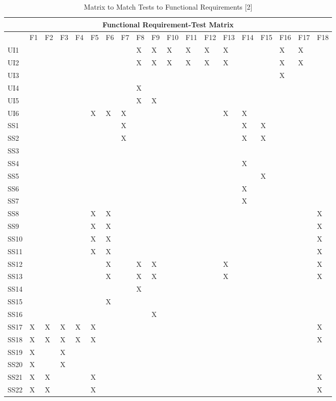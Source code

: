 \documentclass[11pt]{article}
\begin{document}
\begin{table}[H]
\centering
\caption{Matrix to Match Tests to Functional Requirements [2]}
\label{my-label}
\begin{tabular}{| l | l | l | l | l | l | l | l | l | l | l | l | l | l | l | l | l | l | l |}
\hline
\multicolumn{19}{|c|}{\textbf{Functional Requirement-Test Matrix}}                          \\ \hline
 & \tiny{F1} & \tiny{F2} & \tiny{F3} & \tiny{F4} & \tiny{F5} & \tiny{F6} & \tiny{F7} & \tiny{F8} & \tiny{F9} & \tiny{F10} & \tiny{F11} & \tiny{F12} & \tiny{F13} & \tiny{F14} & \tiny{F15} & \tiny{F16} & \tiny{F17} & \tiny{F18} \\ \hline
UI1&&&&&&&&X&X&X&X&X&X&&&X&X& \\ \hline
UI2&&&&&&&&X&X&X&X&X&X&&&X&X& \\ \hline
UI3&&&&&&&&&&&&&&&&X&& \\ \hline
UI4&&&&&&&&X&&&&&&&&&& \\ \hline
UI5&&&&&&&&X&X&&&&&&&&& \\ \hline
UI6&&&&&X&X&X&&&&&&X&X&&&& \\ \hline
SS1&&&&&&&X&&&&&&&X&X&&& \\ \hline
SS2&&&&&&&X&&&&&&&X&X&&& \\ \hline
SS3&&&&&&&&&&&&&&&&&& \\ \hline
SS4&&&&&&&&&&&&&&X&&&& \\ \hline
SS5&&&&&&&&&&&&&&&X&&& \\ \hline
SS6&&&&&&&&&&&&&&X&&&& \\ \hline
SS7&&&&&&&&&&&&&&X&&&& \\ \hline
SS8&&&&&X&X&&&&&&&&&&&&X \\ \hline
SS9&&&&&X&X&&&&&&&&&&&&X \\ \hline
SS10&&&&&X&X&&&&&&&&&&&&X \\ \hline
SS11&&&&&X&X&&&&&&&&&&&&X \\ \hline
SS12&&&&&&X&&X&X&&&&X&&&&&X \\ \hline
SS13&&&&&&X&&X&X&&&&X&&&&&X \\ \hline
SS14&&&&&&&&X&&&&&&&&&& \\ \hline
SS15&&&&&&X&&&&&&&&&&&& \\ \hline
SS16&&&&&&&&&X&&&&&&&&& \\ \hline
SS17&X&X&X&X&X&&&&&&&&&&&&&X \\ \hline
SS18&X&X&X&X&X&&&&&&&&&&&&&X \\ \hline
SS19&X&&X&&&&&&&&&&&&&&& \\ \hline
SS20&X&&X&&&&&&&&&&&&&&& \\ \hline
SS21&X&X&&&X&&&&&&&&&&&&&X \\ \hline
SS22&X&X&&&X&&&&&&&&&&&&&X \\ \hline
\end{tabular}
\end{table}
\end{document}
